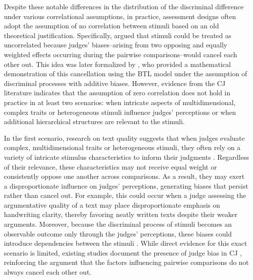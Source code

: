 \documentclass[
  authoryear,
  review,
  1p]{elsarticle}
\begin{document}
Despite these notable differences in the distribution of the discriminal
difference under various correlational assumptions, in practice,
assessment designs often adopt the assumption of no correlation between
stimuli based on an old theoretical justification. Specifically,
\citet{Thurstone_1927b} argued that stimuli could be treated as
uncorrelated because judges' biases--arising from two opposing and
equally weighted effects occurring during the pairwise
comparisons--would cancel each other out. This idea was later formalized
by \citet{Andrich_1978}, who provided a mathematical demonstration of
this cancellation using the BTL model under the assumption of
discriminal processes with additive biases. However, evidence from the
CJ literature indicates that the assumption of zero correlation does not
hold in practice in at least two scenarios: when intricate aspects of
multidimensional, complex traits or heterogeneous stimuli influence
judges' perceptions or when additional hierarchical structures are
relevant to the stimuli.

In the first scenario, research on text quality suggests that when
judges evaluate complex, multidimensional traits or heterogeneous
stimuli, they often rely on a variety of intricate stimulus
characteristics to inform their judgments
\citep{vanDaal_et_al_2016, Lesterhuis_et_al_2018, Chambers_et_al_2022}.
Regardless of their relevance, these characteristics may not receive
equal weight or consistently oppose one another across comparisons. As a
result, they may exert a disproportionate influence on judges'
perceptions, generating biases that persist rather than cancel out. For
example, this could occur when a judge assessing the argumentative
quality of a text may place disproportionate emphasis on handwriting
clarity, thereby favoring neatly written texts despite their weaker
arguments. Moreover, because the discriminal process of stimuli becomes
an observable outcome only through the judges' perceptions, these biases
could introduce dependencies between the stimuli
\citep{vanderLinden_et_al_2017_II}. While direct evidence for this exact
scenario is limited, existing studies document the presence of judge
bias in CJ \citep[\citet{vanDaal_et_al_2016},
\citet{Bartholomew_et_al_2020a}]{Pollitt_et_al_2003}, reinforcing the
argument that the factors influencing pairwise comparisons do not always
cancel each other out.
\end{document}
